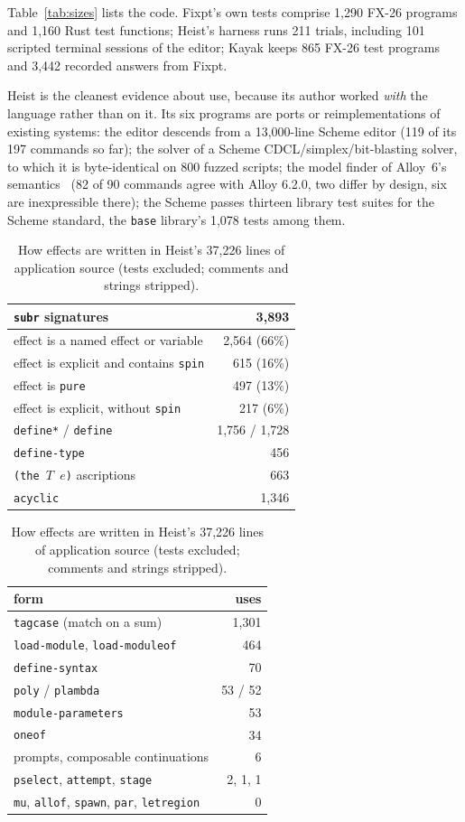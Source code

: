 \documentclass[acmsmall,screen,review]{acmart}
\newcommand{\cd}[1]{\texttt{#1}}
\newcommand{\fx}{FX-26}
\begin{document}
Table~\ref{tab:sizes} lists the code. Fixpt's own tests comprise 1,290
\fx{} programs and 1,160 Rust test functions; Heist's harness runs 211
trials, including 101 scripted terminal sessions of the editor; Kayak
keeps 865 \fx{} test programs and 3,442 recorded answers from Fixpt.

Heist is the cleanest evidence about use, because its author worked
\emph{with} the language rather than on it. Its six programs are
ports or reimplementations of existing systems: the editor descends
from a 13,000-line Scheme editor (119 of its 197 commands so far); the solver
of a Scheme CDCL/simplex/bit-blasting solver, to which it is
byte-identical on 800 fuzzed scripts; the model finder of Alloy~6's
semantics~\cite{alloy} (82 of 90 commands agree with Alloy 6.2.0, two
differ by design, six are inexpressible there); the Scheme passes
thirteen library test suites for the Scheme standard, the \cd{base}
library's 1,078 tests among them.

\begin{table}[t]
\caption{How effects are written in Heist's 37,226 lines of
application source (tests excluded; comments and strings stripped).}
\label{tab:usage}
\small
\begin{minipage}[t]{0.50\linewidth}
\begin{tabular}{@{}lr@{}}
\toprule
\cd{subr} signatures & 3,893\\
\midrule
\quad effect is a named effect or variable & 2,564 (66\%)\\
\quad effect is explicit and contains \cd{spin} & 615 (16\%)\\
\quad effect is \cd{pure} & 497 (13\%)\\
\quad effect is explicit, without \cd{spin} & 217 (6\%)\\
\midrule
\cd{define*} / \cd{define} & 1,756 / 1,728\\
\cd{define-type} & 456\\
\cd{(the $T$ $e$)} ascriptions & 663\\
\cd{acyclic} & 1,346\\
\bottomrule
\end{tabular}
\end{minipage}\hfill
\begin{minipage}[t]{0.46\linewidth}
\begin{tabular}{@{}lr@{}}
\toprule
form & uses\\
\midrule
\cd{tagcase} (match on a sum) & 1,301\\
\cd{load-module}, \cd{load-moduleof} & 464\\
\cd{define-syntax} & 70\\
\cd{poly} / \cd{plambda} & 53 / 52\\
\cd{module-parameters} & 53\\
\cd{oneof} & 34\\
prompts, composable continuations & 6\\
\cd{pselect}, \cd{attempt}, \cd{stage} & 2, 1, 1\\
\cd{mu}, \cd{allof}, \cd{spawn}, \cd{par}, \cd{letregion} & 0\\
\bottomrule
\end{tabular}
\end{minipage}
\end{table}
\end{document}
